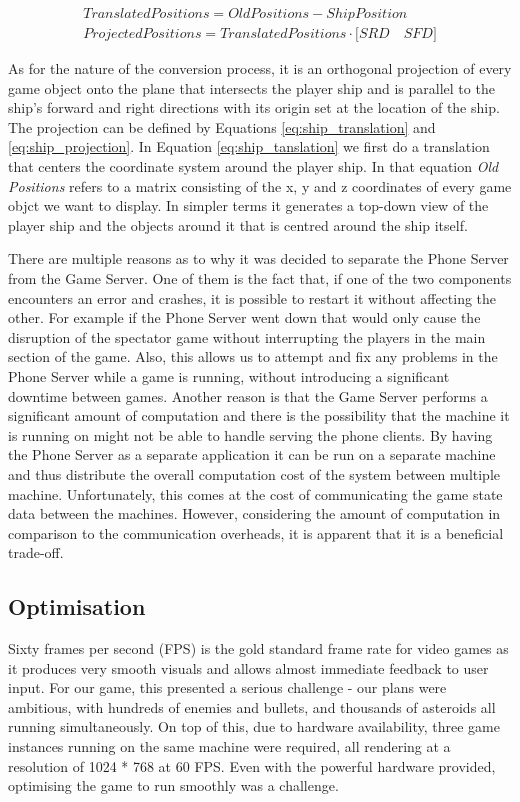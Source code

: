 \documentclass[a4paper,11pt]{article}
\begin{document}
\begin{align}
	Translated Positions = Old Positions - Ship Position \label{eq:ship_translation} \\
    Projected Positions = Translated Positions \cdot \Big[ SRD \quad SFD \Big] \label{eq:ship_projection}
\end{align}

As for the nature of the conversion process, it is an orthogonal projection of every game object onto the plane that intersects the player ship and is parallel to the ship's forward and right directions with its origin set at the location of the ship. The projection can be defined by Equations \ref{eq:ship_translation} and \ref{eq:ship_projection}. In Equation \ref{eq:ship_tanslation} we first do a translation that centers the coordinate system around the player ship. In that equation \emph{Old Positions} refers to a matrix consisting of the x, y and z coordinates of every game objct we want to display. In simpler terms it generates a top-down view of the player ship and the objects around it that is centred around the ship itself.

There are multiple reasons as to why it was decided to separate the Phone Server from the Game Server. One of them is the fact that, if one of the two components encounters an error and crashes, it is possible to restart it without affecting the other. For example if the Phone Server went down that would only cause the disruption of the spectator game without interrupting the players in the main section of the game. Also, this allows us to attempt and fix any problems in the Phone Server while a game is running, without introducing a significant downtime between games. Another reason is that the Game Server performs a significant amount of computation and there is the possibility that the machine it is running on might not be able to handle serving the phone clients. By having the Phone Server as a separate application it can be run on a separate machine and thus distribute the overall computation cost of the system between multiple machine. Unfortunately, this comes at the cost of communicating the game state data between the machines. However, considering the amount of computation in comparison to the communication overheads, it is apparent that it is a beneficial trade-off.

\subsection{Optimisation}
Sixty frames per second (FPS) is the gold standard frame rate for video games as it produces very smooth visuals and allows almost immediate feedback to user input. For our game, this presented a serious challenge - our plans were ambitious, with hundreds of enemies and bullets, and thousands of asteroids all running simultaneously. On top of this, due to hardware availability, three game instances running on the same machine were required, all rendering at a resolution of 1024 * 768 at 60 FPS. Even with the powerful hardware provided, optimising the game to run smoothly was a challenge.
\end{document}
